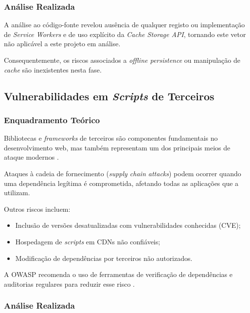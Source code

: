 \subsubsection{Análise Realizada}

A análise ao código-fonte revelou ausência de qualquer registo ou implementação de \textit{Service Workers} e de uso explícito da \textit{Cache Storage API}, tornando este vetor não aplicável a este projeto em análise.

Consequentemente, os riscos associados a \textit{offline persistence} ou manipulação de \textit{cache} são inexistentes nesta fase.

\subsection{Vulnerabilidades em \textit{Scripts} de Terceiros}

\subsubsection{Enquadramento Teórico}

Bibliotecas e \textit{frameworks} de terceiros são componentes fundamentais no desenvolvimento web, mas também representam um dos principais meios de ataque modernos \cite{ref10}.

Ataques à cadeia de fornecimento (\textit{supply chain attacks}) podem ocorrer quando uma dependência legítima é comprometida, afetando todas as aplicações que a utilizam.

Outros riscos incluem:

\begin{itemize}

\item Inclusão de versões desatualizadas com vulnerabilidades conhecidas (CVE);

\item Hospedagem de \textit{scripts} em CDNs não confiáveis;

\item Modificação de dependências por terceiros não autorizados.

\end{itemize}

A OWASP recomenda o uso de ferramentas de verificação de dependências e auditorias regulares para reduzir esse risco \cite{ref11}.

\subsubsection{Análise Realizada}

